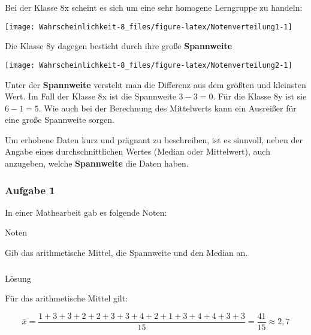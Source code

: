 \documentclass[
  ngerman,
]{book}
\begin{document}
Bei der Klasse 8x scheint es sich um eine sehr homogene Lerngruppe zu handeln:

\begin{center}\texttt{[image: Wahrscheinlichkeit-8\_files/figure-latex/Notenverteilung1-1]} \end{center}

Die Klasse 8y dagegen besticht durch ihre große \textbf{Spannweite}

\begin{center}\texttt{[image: Wahrscheinlichkeit-8\_files/figure-latex/Notenverteilung2-1]} \end{center}

Unter der \textbf{Spannweite} versteht man die Differenz aus dem größten und kleinsten Wert. Im Fall der Klasse 8x ist die Spannweite \(3-3=0\). Für die Klasse 8y ist sie \(6-1=5\). Wie auch bei der Berechnung des Mittelwerts kann ein Ausreißer für eine große Spannweite sorgen.

Um erhobene Daten kurz und prägnant zu beschreiben, ist es sinnvoll, neben der Angabe eines durchschnittlichen Wertes (Median oder Mittelwert), auch anzugeben, welche \textbf{Spannweite} die Daten haben.

\hypertarget{section-21}{%
\subsubsection*{}\label{section-21}}

\hypertarget{aufgabe-1-3}{%
\subsubsection*{Aufgabe 1}\label{aufgabe-1-3}}

In einer Mathearbeit gab es folgende Noten:

Noten

Gib das arithmetische Mittel, die Spannweite und den Median an.

\hypertarget{section-22}{%
\subsubsection*{}\label{section-22}}

Lösung

Für das arithmetische Mittel gilt:

\[\bar{x}= \frac{1+3+3+2+2+3+3+4+2+1+3+4+4+3+3}{15} = \frac{41}{15} \approx 2,7\]
\end{document}
